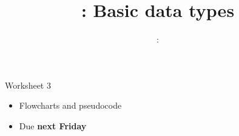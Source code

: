 \usepackage{../../beamerthemeFalmouthGamesAcademy}
\usepackage[utf8]{inputenc}
\usepackage{multimedia}
\graphicspath{ {../../} }

\lstset{language=Python,
    keepspaces=true,
    breaklines=false
}

\usepackage[normalem]{ulem}
\usepackage{wasysym}

\usepackage{algpseudocode}

\usepackage{pdfpages}

\usetikzlibrary{arrows,automata}




\title{\sessionnumber: Basic data types}
\subtitle{\modulecode: \moduletitle}

\frame{\titlepage} 







\begin{frame}{Worksheet 3}
	\begin{itemize}
		\item Flowcharts and pseudocode
		\item Due \textbf{next Friday}
	\end{itemize}
\end{frame}


